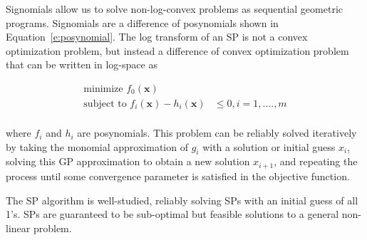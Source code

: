 Signomials allow us to solve non-log-convex problems as sequential geometric programs. Signomials are a difference of posynomials shown in Equation~\ref{e:posynomial}. The log transform of an SP is not a convex optimization problem, but instead a difference of convex optimization problem that can be written in log-space as

\begin{equation}
\begin{aligned}
\text{minimize }f_{0}(\mathbf{x})& \\
\text{subject to }f_{i}(\mathbf{x}) - h_{i}(\mathbf{x})& \leq 0, i = 1, ...., m \\
\end{aligned}
\end{equation}

where $f_{i}$ and $h_{i}$ are posynomials. This problem can be reliably solved iteratively by taking the monomial approximation of $g_{i}$ with a solution or initial guess $x_{i}$, solving this GP approximation to obtain a new solution $x_{i+1}$, and repeating the process until some convergence parameter is satisfied in the objective function.

The SP algorithm is well-studied, reliably solving SPs with an initial guess of all 1’s. SPs are guaranteed to be sub-optimal but feasible solutions to a general non-linear problem.

